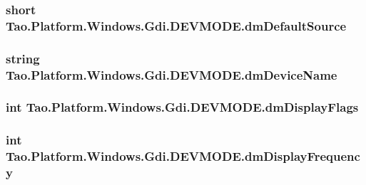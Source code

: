 \label{struct_tao_1_1_platform_1_1_windows_1_1_gdi_1_1_d_e_v_m_o_d_e_aae56ab9a2e277fe1af693b8c2d5c6747}
\hypertarget{struct_tao_1_1_platform_1_1_windows_1_1_gdi_1_1_d_e_v_m_o_d_e_a6a409d6480115ceb3897fa74a693ced8}{
\subsubsection[{dmDefaultSource}]{\setlength{\rightskip}{0pt plus 5cm}short {\bf Tao.Platform.Windows.Gdi.DEVMODE.dmDefaultSource}}}
\label{struct_tao_1_1_platform_1_1_windows_1_1_gdi_1_1_d_e_v_m_o_d_e_a6a409d6480115ceb3897fa74a693ced8}
\hypertarget{struct_tao_1_1_platform_1_1_windows_1_1_gdi_1_1_d_e_v_m_o_d_e_a05da6d44247bec0dc165ae861ee264dc}{
\subsubsection[{dmDeviceName}]{\setlength{\rightskip}{0pt plus 5cm}string {\bf Tao.Platform.Windows.Gdi.DEVMODE.dmDeviceName}}}
\label{struct_tao_1_1_platform_1_1_windows_1_1_gdi_1_1_d_e_v_m_o_d_e_a05da6d44247bec0dc165ae861ee264dc}
\hypertarget{struct_tao_1_1_platform_1_1_windows_1_1_gdi_1_1_d_e_v_m_o_d_e_a5c2c89fb67b5588ceb1d08fbe9b05f68}{
\subsubsection[{dmDisplayFlags}]{\setlength{\rightskip}{0pt plus 5cm}int {\bf Tao.Platform.Windows.Gdi.DEVMODE.dmDisplayFlags}}}
\label{struct_tao_1_1_platform_1_1_windows_1_1_gdi_1_1_d_e_v_m_o_d_e_a5c2c89fb67b5588ceb1d08fbe9b05f68}
\hypertarget{struct_tao_1_1_platform_1_1_windows_1_1_gdi_1_1_d_e_v_m_o_d_e_afef9658b0b4e1e5ab82844a5a41d3309}{
\subsubsection[{dmDisplayFrequency}]{\setlength{\rightskip}{0pt plus 5cm}int {\bf Tao.Platform.Windows.Gdi.DEVMODE.dmDisplayFrequency}}}
